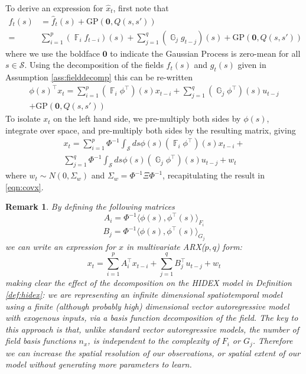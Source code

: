 \documentclass{IEEEtran}
\newcommand{\GP}[2]{\mathrm{GP}(#1,#2)}
\newcommand{\inner}[3]{\langle#1,#2\rangle_{#3}}
\DeclareMathOperator{\F}{\mathbb{F}}
\DeclareMathOperator{\G}{\mathbb{G}}
\newtheorem{remark}{Remark}
\begin{document}
To derive an expression for $\hat{x}_t$, first note that
\begin{equation}
	\begin{split}
	f_t(s) & = \hat{f}_t(s) + \GP{\mathbf{0}}{Q(s,s')}\\
	 = & \sum_{i=1}^{p}( \F_i f_{t-i})(s) + \sum_{j=1}^{q}(\G_j g_{t-j})(s) + \GP{\mathbf{0}}{Q(s,s')}
	\end{split}
\end{equation}
where we use the boldface $\mathbf{0}$ to indicate the Gaussian Process is zero-mean for all $s \in \mathcal{S}$. Using the decomposition of the fields $f_t(s)$ and $g_t(s)$ given in Assumption \ref{ass:fielddecomp} this can be re-written
\begin{equation}
	\begin{split}
	\phi(s)^\top x_t = \sum_{i=1}^{p}(\F_i \phi^\top)(s)x_{t-i} + \sum_{j=1}^{q}(\G_j\phi^\top)(s)u_{t-j} \\ 
	+ \GP{\mathbf{0}}{Q(s,s')}
	\end{split}
\end{equation}
To isolate $x_t$ on the left hand side, we pre-multiply both sides by $\phi(s)$, integrate over space, and pre-multiply both sides by the resulting matrix, giving
\begin{equation}
	\begin{split}
	x_t = 
		\sum_{i=1}^{p} \Phi^{-1} \int_\mathcal{S}ds \phi(s)(\F_i \phi^\top)(s)x_{t-i} + \\
	\sum_{j=1}^{q} \Phi^{-1} \int_\mathcal{S}ds \phi(s)(\G_j\phi^\top)(s)u_{t-j} + w_t
	\end{split}
\end{equation}
where $w_t \sim N(0,\Sigma_w)$ and $\Sigma_w = \Phi^{-1}\Xi\Phi^{-1}$, recapitulating the result in \ref{eqn:covx}.
\begin{remark}
	By defining the following matrices
	\begin{equation}
		\label{eqn:arxA}
		A_i = \Phi^{-1} \inner{\phi(s)}{\phi^\top(s)}{F_i}
	\end{equation}
	\begin{equation}
		\label{eqn:arxB}
		B_j = \Phi^{-1} \inner{\phi(s)}{\phi^\top(s)}{G_j}
	\end{equation}
	we can write an expression for $x$ in multivariate ARX($p,q$) \cite{Ljung} form:
	\begin{equation}
		\label{eqn:arx}
		x_t = \sum_{i=1}^{p} A_i^\top x_{t-i} +  \sum_{j=1}^{q} B_j^\top u_{t-j} + w_t
	\end{equation}
	making clear the effect of the decomposition on the HIDEX model in Definition \ref{def:hidex}: we are representing an infinite dimensional spatiotemporal model using a finite (although probably high) dimensional vector autoregressive model with exogenous inputs, via a basis function decomposition of the field. The key to this approach is that, unlike standard vector autoregressive models, the number of field basis functions $n_x$, is independent to the complexity of $F_i$ or $G_j$. Therefore we can increase the spatial resolution of our observations, or spatial extent of our model without generating more parameters to learn.
\end{remark}
\end{document}
